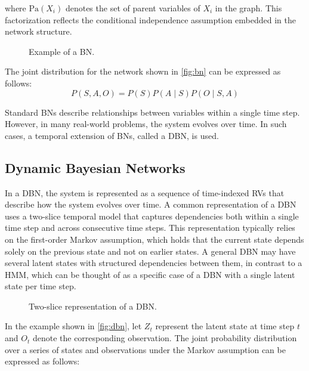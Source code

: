 where $\mathrm{Pa}(X_i)$ denotes the set of parent variables of $X_i$ in the graph. This factorization reflects the conditional independence 
assumption embedded in the network structure.

\begin{figure}[htbp]
    \centering
    
    \caption{Example of a \ac{BN}.}
    \label{fig:bn}
\end{figure}
\noindent The joint distribution for the network shown in \autoref{fig:bn} can be expressed as follows:
\[
P(S,A,O) = P(S)P(A \mid S)P(O \mid S,A)
\]

\par Standard \acp{BN} describe relationships between variables within a single time step. However, in many real-world problems, the system evolves over time. 
In such cases, a temporal extension of \acp{BN}, called a \ac{DBN}, 
is used.

\subsection{Dynamic Bayesian Networks}
\label{sec:dbn}

In a \ac{DBN}, the system is represented as a sequence of time-indexed \acp{RV} that describe how the system evolves over time. 
A common representation of a \ac{DBN} uses a two-slice temporal model that captures dependencies both within a single time step 
and across consecutive time steps. This representation typically relies on the first-order Markov assumption, which holds that the current state depends 
solely on the previous state and not on earlier states. A general \ac{DBN} may have several latent states with structured dependencies between them, 
in contrast to a \ac{HMM}, which can be thought of as a specific case of a \ac{DBN} with a single latent state per time step.



\begin{figure}[htbp]
    \centering
    
    \caption{Two-slice representation of a \ac{DBN}.}
    \label{fig:dbn}
\end{figure}

\par In the example shown in \autoref{fig:dbn}, let $Z_t$ represent the latent state at time step $t$ and $O_t$ denote the corresponding observation. 
The joint probability distribution over a series of states and observations under the Markov assumption can be expressed as follows:

